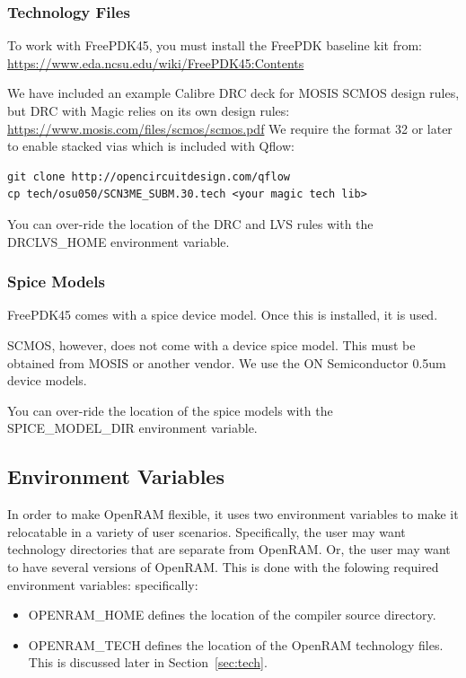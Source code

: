 \subsubsection{Technology Files}

To work with FreePDK45, you must install the FreePDK baseline kit from:
\url{https://www.eda.ncsu.edu/wiki/FreePDK45:Contents}

We have included an example Calibre DRC deck for MOSIS SCMOS design
rules, but DRC with Magic relies on its own design rules:
\url{https://www.mosis.com/files/scmos/scmos.pdf} We require the
format 32 or later to enable stacked vias which is included with
Qflow:
\begin{verbatim}
git clone http://opencircuitdesign.com/qflow
cp tech/osu050/SCN3ME_SUBM.30.tech <your magic tech lib>
\end{verbatim}

You can over-ride the location of the DRC and LVS rules with the
DRCLVS\_HOME environment variable.

\subsubsection{Spice Models}

FreePDK45 comes with a spice device model. Once this is installed, it
is used.

SCMOS, however, does not come with a device spice model. This must be
obtained from MOSIS or another vendor. We use the ON Semiconductor
0.5um device models.

You can over-ride the location of the spice models with the
SPICE\_MODEL\_DIR environment variable.



\subsection{Environment Variables}

In order to make OpenRAM flexible, it uses two environment variables
to make it relocatable in a variety of user scenarios. Specifically,
the user may want technology directories that are separate from
OpenRAM. Or, the user may want to have several versions of
OpenRAM. This is done with the folowing required environment
variables: specifically:
\begin{itemize}
\item OPENRAM\_HOME defines the location of the compiler source directory.
\item OPENRAM\_TECH defines the location of the OpenRAM technology
  files. This is discussed later in Section~\ref{sec:tech}.
\end{itemize}

